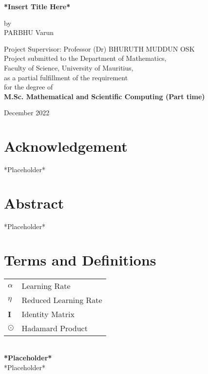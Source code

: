 \documentclass[a4paper,12pt,hidelinks]{report}
\begin{document}
\begin{titlepage}
\begin{center}
\begin{huge}
\textbf{*Insert Title Here*}\\
\end{huge}
\vspace{10mm}
\begin{huge}
by \\
PARBHU Varun \\ 
\end{huge}
\begin{large}
\vspace{15mm}
Project Supervisor: Professor (Dr) BHURUTH MUDDUN OSK \\
\vspace{15mm}
Project submitted to the Department of Mathematics,\\
Faculty of Science, University of Mauritius,\\
as a partial fulfillment of the requirement\\
for the degree of\\
\textbf{M.Sc. Mathematical and Scientific Computing (Part time)}\\
\end{large}
\vspace{30mm}
December 2022
\end{center}
\end{titlepage}
\tableofcontents


\listoffigures
{}

\listoftables
{}

\chapter*{Acknowledgement}
*Placeholder*
\chapter*{Abstract}
*Placeholder*

\nocite{*}

\chapter*{Terms and Definitions}
\begin{tabular}{l | l}
\(\alpha\) & Learning Rate \\
\(\eta\) & Reduced Learning Rate \\
\textbf{I} & Identity Matrix \\
\(\odot\)& Hadamard Product \\
\end{tabular}\\
\noindent \textbf{*Placeholder*} \\ 
*Placeholder*
\newpage
%
%
%
%
%

%

%
\end{document}
